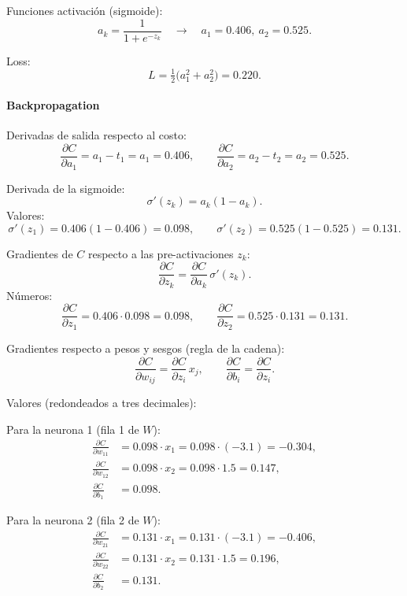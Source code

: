 \documentclass[a4paper,12pt]{article}
\begin{document}
Funciones activación (sigmoide):
\[
a_k =\frac{1}{1+e^{-z_k}}
\quad \to \quad
a_1 =  0.406, ~
a_2 =  0.525.
\]

Loss:
\[
L = \tfrac{1}{2}\big(a_1^2 + a_2^2\big) = 0.220.
\]

\paragraph{Backpropagation}

Derivadas de salida respecto al costo:
\[
\frac{\partial C}{\partial a_1} = a_1 - t_1 = a_1 = 0.406,\qquad
\frac{\partial C}{\partial a_2} = a_2 - t_2 = a_2 = 0.525.
\]

Derivada de la sigmoide:
\[
\sigma'(z_k) = a_k(1-a_k).
\]
Valores:
\[
\sigma'(z_1) = 0.406(1-0.406)=0.098,\qquad
\sigma'(z_2) = 0.525(1-0.525)=0.131.
\]

Gradientes de \(C\) respecto a las pre-activaciones \(z_k\):
\[
\frac{\partial C}{\partial z_k} = \frac{\partial C}{\partial a_k}\,\sigma'(z_k).
\]
Números:
\[
\frac{\partial C}{\partial z_1} = 0.406\cdot 0.098 = 0.098,\qquad
\frac{\partial C}{\partial z_2} = 0.525\cdot 0.131 = 0.131.
\]

Gradientes respecto a pesos y sesgos (regla de la cadena):
\[
\frac{\partial C}{\partial w_{ij}} = \frac{\partial C}{\partial z_i}\, x_j, \qquad
\frac{\partial C}{\partial b_i} = \frac{\partial C}{\partial z_i}.
\]

Valores (redondeados a tres decimales):

Para la neurona 1 (fila 1 de \(W\)):
\[
\begin{aligned}
\frac{\partial C}{\partial w_{11}} &= 0.098\cdot x_1 = 0.098\cdot(-3.1) = -0.304,\\[4pt]
\frac{\partial C}{\partial w_{12}} &= 0.098\cdot x_2 = 0.098\cdot 1.5 = 0.147,\\[4pt]
\frac{\partial C}{\partial b_1} &= 0.098.
\end{aligned}
\]

Para la neurona 2 (fila 2 de \(W\)):
\[
\begin{aligned}
\frac{\partial C}{\partial w_{21}} &= 0.131\cdot x_1 = 0.131\cdot(-3.1) = -0.406,\\[4pt]
\frac{\partial C}{\partial w_{22}} &= 0.131\cdot x_2 = 0.131\cdot 1.5 = 0.196,\\[4pt]
\frac{\partial C}{\partial b_2} &= 0.131.
\end{aligned}
\]
\end{document}
